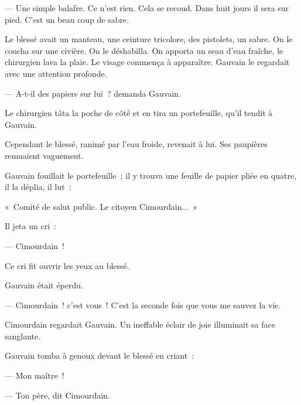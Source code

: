 \documentclass[french,twoside]{book} %
\begin{document}
— Une simple balafre. Ce n’est rien. Cela se recoud. Dans huit jours il sera sur pied. C’est un beau coup de sabre.\par
Le blessé avait un manteau, une ceinture tricolore, des pistolets, un sabre. On le coucha sur une civière. On le déshabilla. On apporta un seau d’eau fraîche, le chirurgien lava la plaie. Le visage commença à apparaître. Gauvain le regardait avec une attention profonde.\par
— A-t-il des papiers sur lui ? demanda Gauvain.\par
 Le chirurgien tâta la poche de côté et en tira un portefeuille, qu’il tendit à Gauvain.\par
Cependant le blessé, ranimé par l’eau froide, revenait à lui. Ses paupières remuaient vaguement.\par
Gauvain fouillait le portefeuille ; il y trouva une feuille de papier pliée en quatre, il la déplia, il lut :\par
« Comité de salut public. Le citoyen Cimourdain... »\par
Il jeta un cri :\par
— Cimourdain !\par
Ce cri fit ouvrir les yeux au blessé.\par
Gauvain était éperdu.\par
— Cimourdain ! c’est vous ! C’est la seconde fois que vous me sauvez la vie.\par
Cimourdain regardait Gauvain. Un ineffable éclair de joie illuminait sa face sanglante.\par
Gauvain tomba à genoux devant le blessé en criant :\par
— Mon maître !\par
— Ton père, dit Cimourdain.
\end{document}
